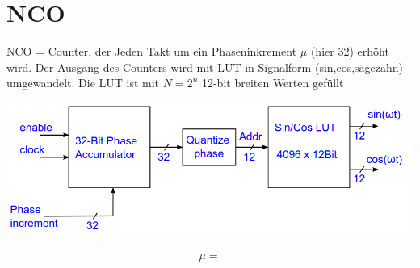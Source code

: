 \documentclass[10pt,a4paper]{article}
\begin{document}
\section{NCO}
NCO = Counter, der Jeden Takt um ein Phaseninkrement $\mu$ (hier 32) erhöht wird.
Der Ausgang des Counters wird mit LUT in Signalform (sin,cos,sägezahn) umgewandelt. 
Die LUT ist mit $N = 2^n$ 12-bit breiten Werten gefüllt 
  \begin{center}
      \includegraphics[width=.35\textwidth]{./img/nco.png}
  \end{center}
  \begin{mdframed}[style=exercise]
    \begin{align}
        \mu =  
    \end{align}
  \end{mdframed}
\end{document}
